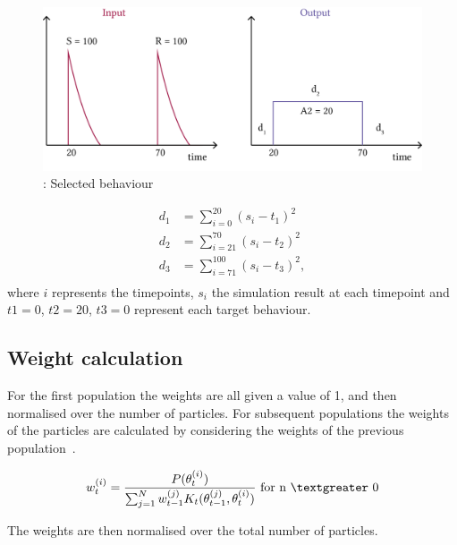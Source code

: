 \begin{figure}[htbp]
	\begin{center}
\includegraphics[scale=0.7]{chapterABCSysBio/images/behaviour.png}
\caption[LoF caption]{\label{fig:abc_behav}: Selected behaviour}
\end{center}
\end{figure}


\begin{align*}
	d_1 &= \sum_{i=0}^{20} (s_i-t_1)^2 \\
	d_2 &= \sum_{i=21}^{70} (s_i-t_2)^2 \\
	d_3 &=  \sum_{i=71}^{100} (s_i-t_3)^2, \\
\end{align*}
where $i$ represents the timepoints, $s_i$ the simulation result at  each timepoint and $t1 = 0$, $t2 = 20$, $t3 = 0$ represent each target behaviour.

\subsection{Weight calculation}
\label{sec:weight}
For the first population the weights are all given a value of 1, and then normalised over the number of particles. For subsequent populations the weights of the particles are calculated by considering the weights of the previous population~\autocite{Toni:2009tr}. 

\begin{align}
w_{t}^{(i)} = \frac{P(\theta_{t}^{(i)})}{\sum_{j=1}^N w_{t-1}^{(j)} K_{t}(\theta_{t-1}^{(j)}, \theta_{t}^{(i)})} \text{ for n $\textgreater$  0}
\end{align}
	
The weights are then normalised over the total number of particles. 
    
